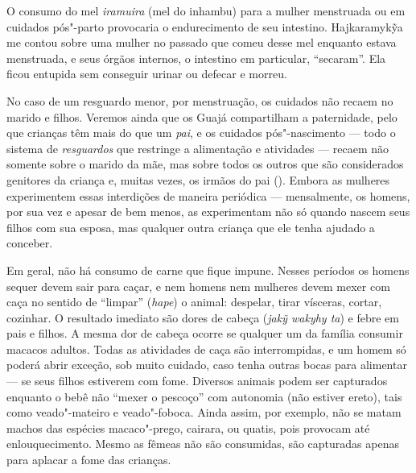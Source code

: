 O consumo do mel \emph{iramuira} (mel do inhambu) para a mulher
menstruada ou em cuidados pós"-parto provocaria o endurecimento de seu
intestino. Hajkaramykỹa me contou sobre uma mulher no passado que comeu
desse mel enquanto estava menstruada, e seus órgãos internos, o
intestino em particular, ``secaram''. Ela ficou entupida sem conseguir
urinar ou defecar e morreu.

No caso de um resguardo menor, por menstruação, os cuidados não recaem
no marido e filhos. Veremos ainda que os Guajá compartilham a
paternidade, pelo que crianças têm mais do que um \emph{pai}, e os
cuidados pós"-nascimento --- todo o sistema de \emph{resguardos} que
restringe a alimentação e atividades --- recaem não somente sobre o marido
da mãe, mas sobre todos os outros que são considerados genitores da
criança e, muitas vezes, os irmãos do pai (). Embora as mulheres
experimentem essas interdições de maneira periódica --- mensalmente, os
homens, por sua vez e apesar de bem menos, as experimentam não só quando
nascem seus filhos com sua esposa, mas qualquer outra criança que ele
tenha ajudado a conceber.

Em geral, não há consumo de carne que fique impune. Nesses períodos os
homens sequer devem sair para caçar, e nem homens nem mulheres devem
mexer com caça no sentido de ``limpar'' (\emph{hape}) o animal: despelar,
tirar vísceras, cortar, cozinhar. O resultado imediato são dores de
cabeça (\emph{jakỹ wakyhy ta}) e febre em pais e filhos. A mesma dor de
cabeça ocorre se qualquer um da família consumir macacos adultos. Todas
as atividades de caça são interrompidas, e um homem só poderá abrir
exceção, sob muito cuidado, caso tenha outras bocas para alimentar --- se
seus filhos estiverem com fome. Diversos animais podem ser capturados
enquanto o bebê não ``mexer o pescoço'' com autonomia (não estiver
ereto), tais como veado"-mateiro e veado"-foboca. Ainda assim, por
exemplo, não se matam machos das espécies macaco"-prego, cairara, ou
quatis, pois provocam até enlouquecimento. Mesmo as fêmeas não são
consumidas, são capturadas apenas para aplacar a fome das crianças.

